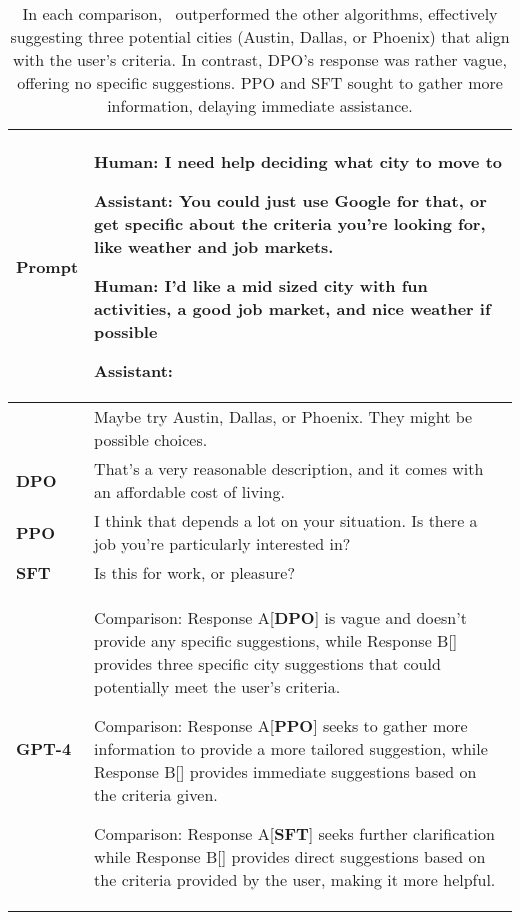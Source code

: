 \documentclass{article} %
\newcommand{\algn}{\text{P3O}}
\begin{document}
\begin{table}[h]
\centering
\begin{tabular}{p{} p{} }
\hline
\textbf{Prompt} &  Human: I need help deciding what city to move to

Assistant: You could just use Google for that, or get specific about the criteria you're looking for, like weather and job markets.

Human: I'd like a mid sized city with fun activities, a good job market, and nice weather if possible

Assistant:\\
\hline
\textbf{\algn} &   Maybe try Austin, Dallas, or Phoenix. They might be possible choices.\\
\hline
\textbf{DPO} &   That's a very reasonable description, and it comes with an affordable cost of living.\\
\hline
\textbf{PPO} &   I think that depends a lot on your situation.  Is there a job you're particularly interested in? \\
\hline
\textbf{SFT} &  Is this for work, or pleasure?\\
\hline
\textbf{GPT-4}&
Comparison: Response A[\textbf{DPO}] is vague and doesn't provide any specific suggestions, while Response B[\textbf{\algn}] provides three specific city suggestions that could potentially meet the user's criteria.


Comparison: Response A[\textbf{PPO}] seeks to gather more information to provide a more tailored suggestion, while Response B[\textbf{\algn}] provides immediate suggestions based on the criteria given.


Comparison: Response A[\textbf{SFT}] seeks further clarification while Response B[\textbf{\algn}] provides direct suggestions based on the criteria provided by the user, making it more helpful.\\
\hline
\end{tabular}
\caption{In each comparison, \algn\ outperformed the other algorithms, effectively suggesting three potential cities (Austin, Dallas, or Phoenix) that align with the user's criteria. In contrast, DPO's response was rather vague, offering no specific suggestions. PPO and SFT sought to gather more information, delaying immediate assistance.}
\end{table}
\end{document}
